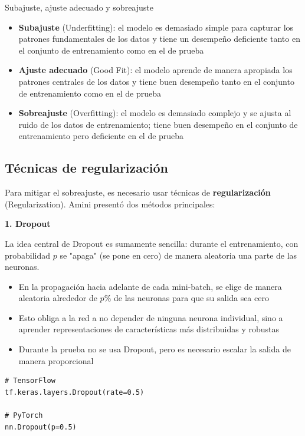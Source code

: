 \documentclass[a4paper]{article}
\begin{document}
\begin{importantbox}{Subajuste, ajuste adecuado y sobreajuste}
\begin{itemize}
\item \textbf{Subajuste} (Underfitting): el modelo es demasiado simple para capturar los patrones fundamentales de los datos y tiene un desempeño deficiente tanto en el conjunto de entrenamiento como en el de prueba
\item \textbf{Ajuste adecuado} (Good Fit): el modelo aprende de manera apropiada los patrones centrales de los datos y tiene buen desempeño tanto en el conjunto de entrenamiento como en el de prueba
\item \textbf{Sobreajuste} (Overfitting): el modelo es demasiado complejo y se ajusta al ruido de los datos de entrenamiento; tiene buen desempeño en el conjunto de entrenamiento pero deficiente en el de prueba
\end{itemize}
\end{importantbox}

\subsection{Técnicas de regularización}

Para mitigar el sobreajuste, es necesario usar técnicas de \textbf{regularización} (Regularization). Amini presentó dos métodos principales:

\textbf{1. Dropout}

La idea central de Dropout es sumamente sencilla: durante el entrenamiento, con probabilidad $p$ se "apaga" (se pone en cero) de manera aleatoria una parte de las neuronas.

\begin{itemize}
\item En la propagación hacia adelante de cada mini-batch, se elige de manera aleatoria alrededor de $p\%$ de las neuronas para que su salida sea cero
\item Esto obliga a la red a no depender de ninguna neurona individual, sino a aprender representaciones de características más distribuidas y robustas
\item Durante la prueba no se usa Dropout, pero es necesario escalar la salida de manera proporcional
\end{itemize}

\begin{lstlisting}[caption={Implementación en código de Dropout}]
# TensorFlow
tf.keras.layers.Dropout(rate=0.5)

# PyTorch
nn.Dropout(p=0.5)
\end{lstlisting}
\end{document}
